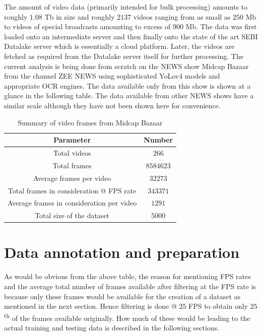 The amount of video data (primarily intended for bulk processing)
amounts to roughly $1.08$ Tb in size and roughly $2137$ videos
ranging from as small as $250$ Mb to videos of special broadcasts
amounting to excess of $900$ Mb. The data was first loaded onto an
intermediate server and then finally onto the state of the art SEBI
Datalake server which is essentially a cloud platform. Later, the
videos are fetched as required from the Datalake server itself for
further processing. The current analysis is being done from scratch
on the NEWS show Midcap Bazaar from the channel ZEE NEWS using
sophisticated YoLov4 models and appropriate OCR engines. The data
available only from this show is shown at a glance in the following
table. The data available from other NEWS shows have a similar scale
although they have not been shown here for convenience.

\begin{table}[h]
  \def\arraystretch{1.5}
  \centering
  \caption{Summary of video frames from Midcap Bazaar}
  \begin{tabular}{|c|c|}
    \hline
    Parameter                                 & Number    \\
    \hline
    Total videos                              & $266$     \\
    \hline
    Total frames                              & $8584623$ \\
    \hline
    Average frames per video                  & $32273$   \\
    \hline
    Total frames in consideration @ FPS rate  & $343371$  \\
    \hline
    Average frames in consideration per video & $1291$    \\
    \hline
    Total size of the dataset                 & $5000$    \\
    \hline
  \end{tabular}
  \label{tab:vid_data_tab}
\end{table}

\section{Data annotation and preparation}

As would be obvious from the above table, the reason for mentioning
FPS rates and the average total number of frames available after
filtering at the FPS rate is because only these frames would be
available for the creation of a dataset as mentioned in the next
section. Hence filtering is done @ $25$ FPS to obtain only
$25$\textsuperscript{th} of the frames available originally. How much
of these would be leading to the actual training and testing data is
described in the following sections. \par

